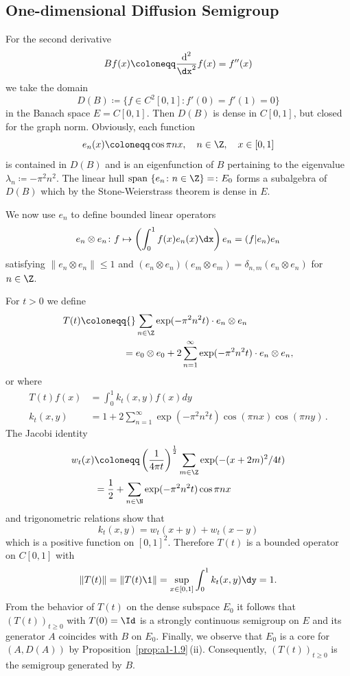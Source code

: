 \subsection{One-dimensional Diffusion Semigroup}\label{subsec:a1-2.7}%
For the second derivative 
\[
    Bf(x) \coloneqq \frac{\text{d}^{2}}{\dx^{2}}f(x) = f''(x)
\]
we take the domain
\[
    D(B) \coloneqq \{f \in C^{2}\left[ 0,1 \right] \colon f'(0) = f'(1) = 0\}
\]
in the Banach space $E = C\left[ 0,1 \right]$.
Then $D(B)$ is dense in $C\left[ 0,1 \right]$, but closed for the graph norm.
Obviously, each function
\[
    e_{n}(x) \coloneqq \cos \pi nx, \quad n \in \Z,\quad x \in [0,1]
\]
is contained in $D(B)$ and is an eigenfunction of\/ $B$ pertaining to the eigenvalue $\lambda_{n} \coloneqq -\pi^{2}n^{2}$.
The linear hull $\text{span }\{e_{n} \colon n \in \Z\} = \colon E_{0}$ forms a subalgebra of\/ $D(B)$ which by the Stone-Weierstrass theorem is dense in $E$.

We now use $e_{n}$ to define bounded linear operators 
\[
	e_{n} \otimes e_{n} \colon f \mapsto \left(\int_{0}^{1} f(x)e_{n}(x) \dx \right)e_{n} 
		= ( f | e_{n} ) e_{n} %
\]
satisfying $\|e_{n} \otimes e_{n}\| \leq 1$ and
$(e_{n} \otimes e_{n})(e_{m} \otimes e_{m}) = \delta_{n,m}(e_{n} \otimes e_{n})$ for $n \in \Z$.

For $t > 0$ we define
\begin{align*}
T(t) \coloneqq{}& \sum_{n \in \Z} \exp(-\pi^{2}n^{2}t) \cdot e_{n} \otimes e_{n} \\
		={}& e_{0} \otimes e_{0} + 2\sum_{n=1}^{\infty} \exp(-\pi^{2}n^{2}t) \cdot e_{n} \otimes e_{n},
\end{align*}
or
where
\begin{align*}
    T(t)f(x) &= \int_{0}^{1} k_{t}(x,y)f(x)dy \\
     k_{t}(x,y) &= 1 + 2\sum_{n=1}^{\infty} \exp(-\pi^{2}n^{2}t) \cos(\pi nx) \cos(\pi ny)\,.
\end{align*}
The Jacobi identity
\begin{align*}
    w_{t}(x) &\coloneqq \left( \frac{1}{4\pi t}\right)^{\frac{1}{2}} \sum_{m \in \Z} \exp(-(x+2m)^{2}/4t) \\
    &= \frac{1}{2} + \sum_{n \in \N} \exp(-\pi^{2}n^{2}t) \cos\pi nx
\end{align*}
and trigonometric relations show that
\[
    k_{t}(x,y) = w_{t}(x+y) + w_{t}(x-y)
\]
which is a positive function on $\left[ 0,1 \right]^{2}$.
Therefore $T(t)$ is a bounded operator on $C\left[ 0,1 \right]$ with
\[
    \|T(t)\| = \|T(t)\1\| = \sup_{x \in \left[ 0,1 \right]} \int_{0}^{1} k_{t}(x,y)\dy = 1 .
\]
From the behavior of\/ $T(t)$ on the dense subspace $E_{0}$ it follows that $(T(t))_{t \geq 0}$ with $T(0) = \Id$ is a strongly continuous semigroup on $E$ and its generator $A$ coincides with $B$ on $E_{0}$.
Finally, we observe that $E_{0}$ is a core for $(A,D(A))$ by Proposition~\ref{prop:a1-1.9}\,(ii).
Consequently, $(T(t))_{t \geq 0}$ is the semigroup generated by $B$.
